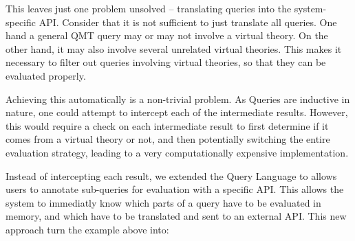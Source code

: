 This leaves just one problem unsolved -- translating queries into the system-specific API. 
Consider that it is not sufficient to just translate all queries. 
One hand a general QMT query may or may not involve a virtual theory. 
On the other hand, it may also involve several unrelated virtual theories. 
This makes it necessary to filter out queries involving virtual theories, so that they can be evaluated properly. 

Achieving this automatically is a non-trivial problem. 
As Queries are inductive in nature, one could attempt to intercept each of the intermediate results. 
However, this would require a check on each intermediate result to first determine if it comes from a virtual theory or not, and then potentially switching the entire evaluation strategy, leading to a very computationally expensive implementation. 

Instead of intercepting each result, we extended the Query Language to allows users to annotate sub-queries for evaluation with a specific API. 
This allows the system to immediatly know which parts of a query have to be evaluated in \mmt memory, and which have to be translated and sent to an external API. 
This new approach turn the example above into:



